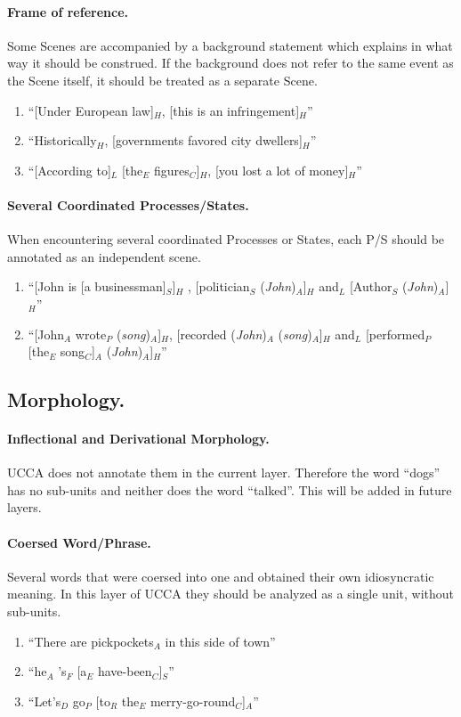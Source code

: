 \documentclass[11pt]{article}
\newcommand{\be}{\begin{enumerate}}
\newcommand{\ee}{\end{enumerate}}
\newcommand{\rem}[1]{{(\it #1})}
\begin{document}
\paragraph{Frame of reference.} Some Scenes are accompanied by a background statement which explains in what way it should be construed. If the background does not refer to the same event as the Scene itself, it should be treated as a separate Scene.
\be \item
``[Under European law]$_H$, [this is an infringement]$_H$''
\item
``Historically$_H$, [governments favored city dwellers]$_H$''
\item
``[According to]$_L$ [the$_E$ figures$_C$]$_H$, [you lost a lot of money]$_H$''
\ee

\paragraph{Several Coordinated Processes/States.}
When encountering several coordinated Processes or States, each P/S should be annotated as an independent scene. 

\be 
\item 
``[John is [a businessman]$_S$]$_H$ , [politician$_S$ \rem{John}$_A$]$_H$ and$_L$ [Author$_S$ \rem{John}$_A$]$_H$''
\item
``[John$_A$ wrote$_P$ \rem{song}$_A$]$_H$, [recorded \rem{John}$_A$ \rem{song}$_A$]$_H$ and$_L$ [performed$_P$ [the$_E$ song$_C$]$_A$ \rem{John}$_A$]$_H$''
\ee


\subsection{Morphology.}

\paragraph{Inflectional and Derivational Morphology.} UCCA does not annotate them in the current layer. Therefore the word ``dogs'' has no sub-units and neither does the word ``talked''. This will be added in future layers.

\paragraph{Coersed Word/Phrase.}
Several words that were coersed into one and obtained their own idiosyncratic meaning. In this layer of UCCA they should be analyzed as a single unit, without sub-units.
\be \item
``There are pickpockets$_A$ in this side of town''
\item
``he$_A$ 's$_F$ [a$_E$ have-been$_C$]$_S$''
\item
``Let's$_D$ go$_P$ [to$_R$ the$_E$ merry-go-round$_C$]$_A$''
\ee
\end{document}
